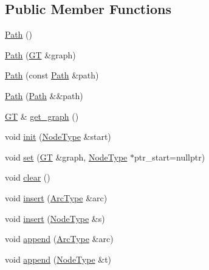 \subsection*{Public Member Functions}
\begin{DoxyCompactItemize}
\item 
\hyperlink{class_designar_1_1_path_a47a3b5f01fba6977f57ad84fb6f1fda9}{Path} ()
\item 
\hyperlink{class_designar_1_1_path_a92b56646f20bdce1ed05601b983235d6}{Path} (\hyperlink{demo-buildgraph_8_c_a3001c40d2c31ca87ed96cd7d1334a55e}{GT} \&graph)
\item 
\hyperlink{class_designar_1_1_path_a9dc80e39b78c86740d5731899f5cb204}{Path} (const \hyperlink{class_designar_1_1_path}{Path} \&path)
\item 
\hyperlink{class_designar_1_1_path_a873d668006017c410e6808ffb162ceb8}{Path} (\hyperlink{class_designar_1_1_path}{Path} \&\&path)
\item 
\hyperlink{demo-buildgraph_8_c_a3001c40d2c31ca87ed96cd7d1334a55e}{GT} \& \hyperlink{class_designar_1_1_path_a0d4ef1ffdb4bcf2b34267e33c2177773}{get\+\_\+graph} ()
\item 
void \hyperlink{class_designar_1_1_path_aed6cd565cad808bd6d08f0485e89077d}{init} (\hyperlink{class_designar_1_1_path_a7b499fd50e96e3360968d4cfef7a3736}{Node\+Type} \&start)
\item 
void \hyperlink{class_designar_1_1_path_a72190e285c2c85aae75b0c8435f1eee9}{set} (\hyperlink{demo-buildgraph_8_c_a3001c40d2c31ca87ed96cd7d1334a55e}{GT} \&graph, \hyperlink{class_designar_1_1_path_a7b499fd50e96e3360968d4cfef7a3736}{Node\+Type} $\ast$ptr\+\_\+start=nullptr)
\item 
void \hyperlink{class_designar_1_1_path_acc2f49cce82c42701cb703c6d87f6dc2}{clear} ()
\item 
void \hyperlink{class_designar_1_1_path_a0deab29b3241b5df6217bdc705dab131}{insert} (\hyperlink{class_designar_1_1_path_a6e13966351659cedcf3233098b2b7384}{Arc\+Type} \&arc)
\item 
void \hyperlink{class_designar_1_1_path_a9f3a77788f312c464d46d4f76f9b9d6a}{insert} (\hyperlink{class_designar_1_1_path_a7b499fd50e96e3360968d4cfef7a3736}{Node\+Type} \&s)
\item 
void \hyperlink{class_designar_1_1_path_a985717f0848469b05dfc8172eb483ad4}{append} (\hyperlink{class_designar_1_1_path_a6e13966351659cedcf3233098b2b7384}{Arc\+Type} \&arc)
\item 
void \hyperlink{class_designar_1_1_path_a0e69c5a5e1fffd17059b236e13f6587a}{append} (\hyperlink{class_designar_1_1_path_a7b499fd50e96e3360968d4cfef7a3736}{Node\+Type} \&t)

\end{DoxyCompactItemize}
